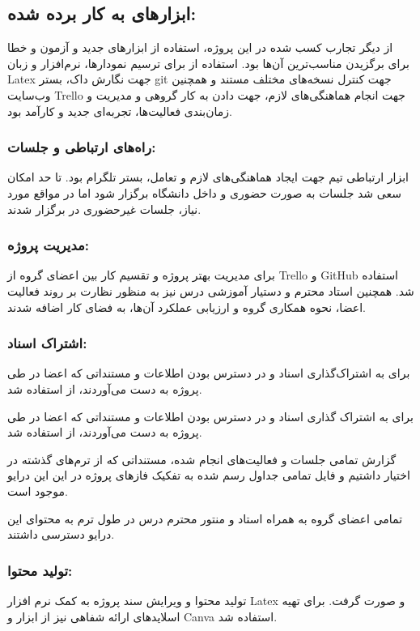 \documentclass[12pt]{article}
\begin{document}
	\subsection{ابزارهای به کار برده شده:‫‬‬}
از دیگر تجارب کسب شده در این پروژه، استفاده از ابزارهای جدید و آزمون و خطا برای برگزیدن مناسب‌ترین آن‌ها بود. استفاده از
 برای ترسیم نمودارها، نرم‌افزار و زبان Latex جهت نگارش داک، بستر git جهت کنترل نسخه‌های مختلف مستند و همچنین وب‌سایت Trello جهت انجام هماهنگی‌های لازم، جهت دادن به کار گروهی و مدیریت و زمان‌بندی فعالیت‌ها، تجربه‌ای جدید و کارآمد بود.
	\subsubsection{راه‌های ارتباطی و جلسات:‫‬‬}
	ابزار ارتباطی تیم جهت ایجاد هماهنگی‌های لازم و تعامل، بستر تلگرام بود.
	تا حد امکان سعی شد جلسات به صورت حضوری و داخل دانشگاه برگزار شود اما در مواقع مورد نیاز، جلسات غیرحضوری در
	 برگزار شدند.

	\subsubsection{مدیریت پروژه:‫‬‬}
برای مدیریت بهتر پروژه و تقسیم کار بین اعضای گروه از Trello و GitHub استفاده شد. همچنین استاد محترم و دستیار آموزشی درس نیز به منظور نظارت بر روند فعالیت اعضا، نحوه همکاری گروه و ارزیابی عملکرد آن‌ها، به فضای کار اضافه شدند.

	\subsubsection{اشتراک اسناد:‫‬‬}
برای به اشتراک‌گذاری اسناد و در دسترس بودن اطلاعات و مستنداتی که اعضا در طی پروژه به دست می‌آوردند، از
 استفاده شد.

 برای به اشتراک گذاری اسناد و در دسترس بودن اطلاعات و مستنداتی که اعضا در طی پروژه به دست می‌آوردند، از
  استفاده شد.

 گزارش تمامی جلسات و فعالیت‌های انجام شده، مستنداتی که از ترم‌های گذشته در اختیار داشتیم و فایل تمامی جداول رسم شده به تفکیک فازهای پروژه در این این درایو موجود است.

 تمامی اعضای گروه به همراه استاد و منتور محترم درس در طول ترم به محتوای این درایو دسترسی داشتند.

	\subsubsection{تولید محتوا:‫‬‬}
تولید محتوا و ویرایش سند پروژه به کمک نرم افزار Latex و
 صورت گرفت. برای تهیه اسلایدهای ارائه شفاهی نیز از ابزار
   و Canva استفاده شد.
\end{document}
